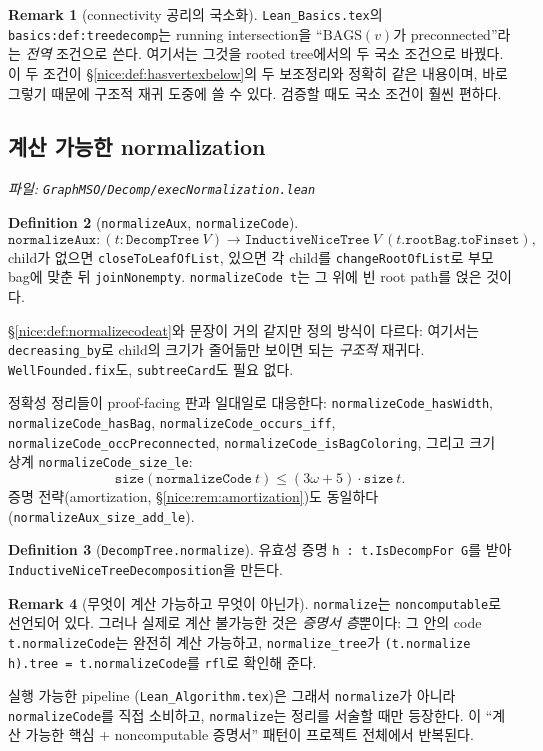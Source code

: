 \documentclass[11pt]{article}
\theoremstyle{definition}
\newtheorem{definition}{Definition}[section]
\newtheorem{remark}[definition]{Remark}
\theoremstyle{plain}
\newcommand{\lean}[1]{\texttt{#1}}
\newcommand{\leanfile}[1]{\texttt{#1}}
\begin{document}
\begin{remark}[connectivity 공리의 국소화]
\leanfile{Lean\_Basics.tex}의 \lean{basics:def:treedecomp}는 running
intersection을 ``$\mathrm{BAGS}(v)$가 preconnected''라는 \emph{전역} 조건으로
쓴다. 여기서는 그것을 rooted tree에서의 두 국소 조건으로 바꿨다. 이 두
조건이 \S\ref{nice:def:hasvertexbelow}의 두 보조정리와 정확히 같은 내용이며,
바로 그렇기 때문에 구조적 재귀 도중에 쓸 수 있다. 검증할 때도 국소 조건이
훨씬 편하다.
\end{remark}

\subsection{계산 가능한 normalization}

\emph{파일: \leanfile{GraphMSO/Decomp/execNormalization.lean}}

\begin{definition}[\lean{normalizeAux}, \lean{normalizeCode}]
\label{nice:def:execnormalize}
\[
  \lean{normalizeAux} : (t : \lean{DecompTree}\ V) \to \lean{InductiveNiceTree}\ V\ (t.\lean{rootBag}.\lean{toFinset}),
\]
child가 없으면 \lean{closeToLeafOfList}, 있으면 각 child를
\lean{changeRootOfList}로 부모 bag에 맞춘 뒤 \lean{joinNonempty}.
\lean{normalizeCode t}는 그 위에 빈 root path를 얹은 것이다.
\end{definition}

\S\ref{nice:def:normalizecodeat}와 문장이 거의 같지만 정의 방식이 다르다:
여기서는 \lean{decreasing\_by}로 child의 크기가 줄어듦만 보이면 되는
\emph{구조적} 재귀다. \lean{WellFounded.fix}도, \lean{subtreeCard}도 필요 없다.

정확성 정리들이 proof-facing 판과 일대일로 대응한다:
\lean{normalizeCode\_hasWidth}, \lean{normalizeCode\_hasBag},
\lean{normalizeCode\_occurs\_iff}, \lean{normalizeCode\_occPreconnected},
\lean{normalizeCode\_isBagColoring}, 그리고 크기 상계
\lean{normalizeCode\_size\_le}:
\[
  \lean{size}(\lean{normalizeCode}\ t) \le (3\omega+5)\cdot \lean{size}\ t.
\]
증명 전략(amortization, \S\ref{nice:rem:amortization})도 동일하다
(\lean{normalizeAux\_size\_add\_le}).

\begin{definition}[\lean{DecompTree.normalize}]
\label{nice:def:execnormalizecert}
유효성 증명 \lean{h : t.IsDecompFor G}를 받아
\lean{InductiveNiceTreeDecomposition}을 만든다.
\end{definition}

\begin{remark}[무엇이 계산 가능하고 무엇이 아닌가]
\label{nice:rem:whatcomputes}
\lean{normalize}는 \lean{noncomputable}로 선언되어 있다. 그러나 실제로
계산 불가능한 것은 \emph{증명서 층}뿐이다: 그 안의 code
\lean{t.normalizeCode}는 완전히 계산 가능하고, \lean{normalize\_tree}가
\lean{(t.normalize h).tree = t.normalizeCode}를 \lean{rfl}로 확인해 준다.

실행 가능한 pipeline (\leanfile{Lean\_Algorithm.tex})은 그래서
\lean{normalize}가 아니라 \lean{normalizeCode}를 직접 소비하고,
\lean{normalize}는 정리를 서술할 때만 등장한다. 이 ``계산 가능한 핵심 +
noncomputable 증명서'' 패턴이 프로젝트 전체에서 반복된다.
\end{remark}
\end{document}
